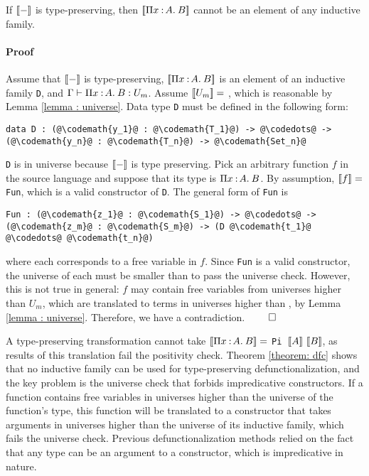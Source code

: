 \begin{theorem} If ${[\![ - ]\!]}$ is type-preserving, then ${[\![ \Pi x\mkern1.5mu{\hspace{0.5mm}{:}\hspace{0.5mm}} A.\hspace{0.8mm}B ]\!]}$ cannot be an element of any inductive family.
\paragraph{Proof} 
Assume that ${[\![ - ]\!]}$ is type-preserving, ${[\![ \Pi x\mkern1.5mu{\hspace{0.5mm}{:}\hspace{0.5mm}} A.\hspace{0.8mm}B ]\!]}$ is an element of an inductive family \texttt{D}, and $\Gamma \vdash \Pi x\mkern1.5mu{\hspace{0.5mm}{:}\hspace{0.5mm}} A.\hspace{0.8mm}B : U_m$. Assume ${[\![ U_m ]\!]} =$ , which is reasonable by Lemma \ref{lemma : universe}. Data type \texttt{D} must be defined in the following form:
\begin{lstlisting}[escapechar=@]
data D : (@\codemath{y_1}@ : @\codemath{T_1}@) -> @\codedots@ -> (@\codemath{y_n}@ : @\codemath{T_n}@) -> @\codemath{Set_n}@
\end{lstlisting}
\texttt{D} is in universe  because ${[\![ - ]\!]}$ is type preserving.
Pick an arbitrary function $f$ in the source language and suppose that its type is $\Pi x\mkern1.5mu{\hspace{0.5mm}{:}\hspace{0.5mm}} A.\hspace{0.8mm}B$. By assumption, ${[\![ f ]\!]} =$ \texttt{Fun}, which is a valid constructor of \texttt{D}. The general form of \texttt{Fun} is
\begin{lstlisting}[escapechar=@]
Fun : (@\codemath{z_1}@ : @\codemath{S_1}@) -> @\codedots@ -> (@\codemath{z_m}@ : @\codemath{S_m}@) -> (D @\codemath{t_1}@ @\codedots@ @\codemath{t_n}@)
\end{lstlisting}
where each  corresponds to a free variable in $f$. Since \texttt{Fun} is a valid constructor, the universe of each  must be smaller than  to pass the universe check. However, this is not true in general: $f$ may contain free variables from universes higher than $U_m$, which are translated to terms in universes higher than , by Lemma \ref{lemma : universe}. Therefore, we have a contradiction. $\qed$
\label{theorem: dfc}
\end{theorem}

A type-preserving transformation cannot take ${[\![ \Pi x\mkern1.5mu{\hspace{0.5mm}{:}\hspace{0.5mm}} A.\hspace{0.8mm}B ]\!]} =$ \texttt{Pi }$\bbracket{A}\ \bbracket{B}$, as results of this translation fail the positivity check. Theorem \ref{theorem: dfc} shows that no inductive family can be used for type-preserving defunctionalization, and the key problem is the universe check that forbids impredicative constructors. If a function contains free variables in universes higher than the universe of the function's type, this function will be translated to a constructor that takes arguments in universes higher than the universe of its inductive family, which fails the universe check. Previous defunctionalization methods relied on the fact that any type can be an argument to a constructor, which is impredicative in nature.



